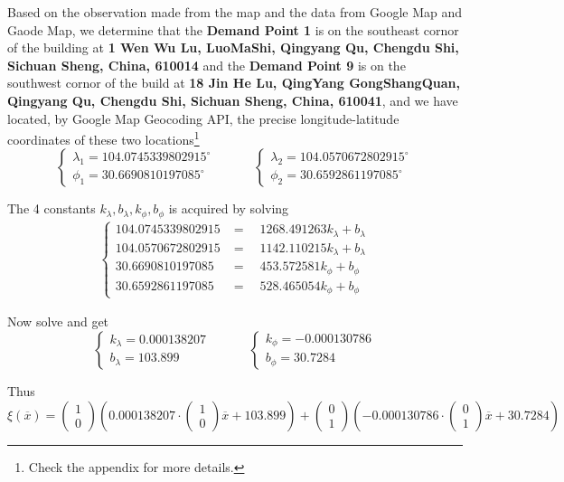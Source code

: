 \documentclass[10pt]{article}
\begin{document}
Based on the observation made from the map and the data from Google Map and Gaode Map, we determine that the \textbf{Demand Point 1} is on the southeast cornor of the building at \textbf{1 Wen Wu Lu, LuoMaShi, Qingyang Qu, Chengdu Shi, Sichuan Sheng, China, 610014} and the \textbf{Demand Point 9} is on the southwest cornor of the build at \textbf{18 Jin He Lu, QingYang GongShangQuan, Qingyang Qu, Chengdu Shi, Sichuan Sheng, China, 610041}, and we have located, by Google Map Geocoding API, the precise longitude-latitude coordinates of these two locations\footnote{Check the appendix for more details.}
\[
\begin{cases}
\lambda_1=104.0745339802915^\circ\\
\phi_1=30.6690810197085^\circ
\end{cases}
\quad\quad\quad
\begin{cases}
\lambda_2=104.0570672802915^\circ\\
\phi_2=30.6592861197085^\circ
\end{cases}
\]

The 4 constants $k_\lambda,b_\lambda,k_\phi,b_\phi$ is acquired by solving
\begin{align}
\begin{cases}
104.0745339802915&=\quad1268.491263 k_\lambda+b_\lambda\\
104.0570672802915&=\quad1142.110215 k_\lambda+b_\lambda\\
30.6690810197085&=\quad453.572581 k_\phi+b_\phi\\
30.6592861197085&=\quad528.465054 k_\phi+b_\phi
\end{cases}
\end{align}

Now solve and get
\[
\begin{cases}
k_\lambda=0.000138207\\
b_\lambda=103.899
\end{cases}
\quad\quad\quad
\begin{cases}
k_\phi=-0.000130786\\
b_\phi=30.7284
\end{cases}
\]

Thus
\[
\xi(\overline{x})=\begin{pmatrix}1\\0\end{pmatrix}\left(0.000138207\cdot\begin{pmatrix}1\\0\end{pmatrix}\overline{x}+103.899\right)+\begin{pmatrix}0\\1\end{pmatrix}\left(-0.000130786\cdot\begin{pmatrix}0\\1\end{pmatrix}\overline{x}+30.7284\right)
\]
\end{document}
